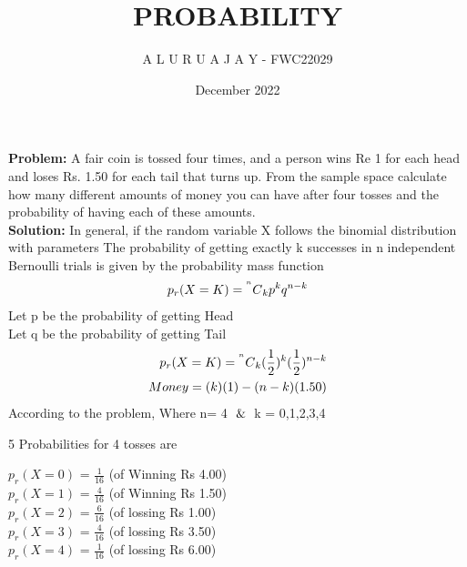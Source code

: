 \documentclass{article}
\newcommand\Mycomb[2][^n]{\prescript{#1\mkern-0.5mu}{}C_{#2}}
\newcommand{\Problem}{\noindent \textbf{Problem: }}
\newcommand{\solution}{\noindent \textbf{Solution: }}
\begin{document}
\title{\textbf{PROBABILITY}}
\author{A L U R U A J A Y - FWC22029}
\date{December 2022}


\maketitle

\Problem A fair coin is tossed four times, and a person wins Re 1 for each head and loses Rs. 1.50 for each tail that turns up. From the sample space calculate how many different amounts of money you can have after four tosses and the probability of having each of these amounts.\\

\solution
In general, if the random variable X follows the binomial distribution with parameters The probability of getting exactly k successes in n independent Bernoulli trials is given by the probability mass function\\
\begin{align}
    p_r(X=K) = \Mycomb{k}p^k q^{n-k}
\end{align}
Let p be the probability of getting Head
\vspace{0.1cm}\\
Let q be the probability of getting Tail\\
\begin{align}
    p_r(X=K) = \Mycomb{k}(\frac{1}{2})^k (\frac{1}{2})^{n-k} \\  
    Money = (k)(1)-(n-k)(1.50)
\end{align}
According to the problem, Where n= 4 $\And$ k = 0,1,2,3,4\\
\begin{flushleft}
    5 Probabilities for 4 tosses are
\end{flushleft}
 \begin{math}p_r(X=0)\end{math} = $\frac{1}{16}$ (of Winning Rs 4.00)
\vspace{0.2cm}\\
\begin{math}p_r(X=1)\end{math} = $\frac{4}{16}$ (of Winning Rs 1.50)
\vspace{0.2cm}\\
\begin{math}p_r(X=2)\end{math} = $\frac{6}{16}$ (of lossing Rs 1.00)
\vspace{0.2cm}\\
\begin{math}p_r(X=3)\end{math} = $\frac{4}{16}$ (of lossing Rs 3.50)
\vspace{0.2cm}\\
\begin{math}p_r(X=4)\end{math} = $\frac{1}{16}$ (of lossing Rs 6.00)
\end{document}
